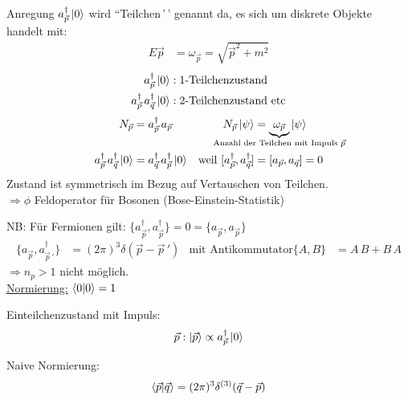 Anregung $a_{\vec{p}}^\dagger \ket{0}$ wird ``Teilchen\,'\,' genannt da, es sich um diskrete Objekte handelt mit: 
	\begin{align*}
		E \vec{p} &= \omega_{\vec{p}} = \sqrt{\vec{p}^2 + m^2} 
	\end{align*}
	\begin{align*}
		a_{\vec{p}}^\dagger \ket{0} &: \text{1-Teilchenzustand} \\
		a_{\vec{p}}^\dagger\, a_{\vec{q}}^\dagger \ket{0} &: \text{2-Teilchenzustand etc}
	\end{align*}
	\begin{align*}
		N_{\vec{p}} &= a_{\vec{p}}^\dagger \,a_{\vec{p}} & 
		N_{\vec{p}} \ket{\psi} &= \underbrace{\omega_{\vec{p}}}_{\mathclap{\text{Anzahl der Teilchen mit Impuls }\vec{p}}} \ket{\psi} \\
		a_{\vec{p}}^\dagger\, a_{\vec{q}}^\dagger \ket{0} &= a_{\vec{q}}^\dagger\, a_{\vec{p}}^\dagger \ket{0} &
		\text{weil } [a_{\vec{p}}^\dagger, a_{\vec{q}}^\dagger] &= [a_{\vec{p}}, a_{\vec{q}}] = 0
	\end{align*}
Zustand ist symmetrisch im Bezug auf Vertauschen von Teilchen. 
\\
$\Rightarrow \phi$ Feldoperator für Bosonen (Bose-Einstein-Statistik) 

NB: Für Fermionen gilt: $ \{a_{\vec{p}}^\dagger, a_{\vec{p}}^\dagger\} = 0 = \{a_{\vec{p}}, a_{\vec{p}}\}$ 
	\begin{align*}
		\{a_{\vec{p}}, a_{\vec{p}\,'}^\dagger\} &= (2 \pi)^3 \delta (\vec{p} - \vec{p}\,') 
		& \text{mit Antikommutator} \{A, B\} &= A\, B + B\, A
	\end{align*}
$\Rightarrow n_p > 1$ nicht möglich.
\\
\underline{Normierung:} $\braket{0 | 0} = 1$ 

Einteilchenzustand mit Impuls: %
	\begin{align*}
		\vec{p} : \ket{\vec{p}} \propto a_{\vec{p}}^\dagger \ket{0}
	\end{align*}

Naive Normierung: %
	\begin{align*}
		\braket{\vec{p} | \vec{q}} = (2 \pi)^3 \delta^{(3)}(\vec{q} - \vec{p})
	\end{align*}

